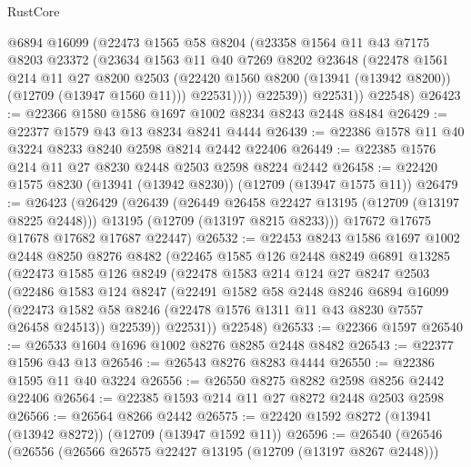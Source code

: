 \begin{lexlean}{RustCore}
\begin{coremodule}
              @6894
              @16099
              (@22473
                @1565
                @58
                @8204
                (@23358
                  @1564
                  @11
                  @43
                  @7175
                  @8203
                  @23372
                  (@23634
                    @1563
                    @11
                    @40
                    @7269
                    @8202
                    @23648
                    (@22478
                      @1561
                      @214
                      @11
                      @27
                      @8200
                      @2503
                      (@22420 @1560 @8200 (@13941 (@13942 @8200)) (@12709 (@13947 @1560 @11)))
                      @22531))))
              @22539))
          @22531))
      @22548)
@26423 := @22366 @1580 @1586 @1697 @1002 @8234 @8243 @2448 @8484
@26429 := @22377 @1579 @43 @13 @8234 @8241 @4444
@26439 := @22386 @1578 @11 @40 @3224 @8233 @8240 @2598 @8214 @2442 @22406
@26449 := @22385 @1576 @214 @11 @27 @8230 @2448 @2503 @2598 @8224 @2442
@26458 := @22420 @1575 @8230 (@13941 (@13942 @8230)) (@12709 (@13947 @1575 @11))
@26479 := @26423
    (@26429
      (@26439
        (@26449 @26458 @22427 @13195 (@12709 (@13197 @8225 @2448)))
        @13195
        (@12709 (@13197 @8215 @8233)))
      @17672
      @17675
      @17678
      @17682
      @17687
      @22447)
@26532 := @22453
    @8243
    @1586
    @1697
    @1002
    @2448
    @8250
    @8276
    @8482
    (@22465
      @1585
      @126
      @2448
      @8249
      @6891
      @13285
      (@22473
        @1585
        @126
        @8249
        (@22478
          @1583
          @214
          @124
          @27
          @8247
          @2503
          (@22486
            @1583
            @124
            @8247
            (@22491
              @1582
              @58
              @2448
              @8246
              @6894
              @16099
              (@22473 @1582 @58 @8246 (@22478 @1576 @1311 @11 @43 @8230 @7557 @26458 @24513))
              @22539))
          @22531))
      @22548)
@26533 := @22366 @1597
@26540 := @26533 @1604 @1696 @1002 @8276 @8285 @2448 @8482
@26543 := @22377 @1596 @43 @13
@26546 := @26543 @8276 @8283 @4444
@26550 := @22386 @1595 @11 @40 @3224
@26556 := @26550 @8275 @8282 @2598 @8256 @2442 @22406
@26564 := @22385 @1593 @214 @11 @27 @8272 @2448 @2503 @2598
@26566 := @26564 @8266 @2442
@26575 := @22420 @1592 @8272 (@13941 (@13942 @8272)) (@12709 (@13947 @1592 @11))
@26596 := @26540
    (@26546
      (@26556
        (@26566 @26575 @22427 @13195 (@12709 (@13197 @8267 @2448)))

\end{coremodule}
\end{lexlean}
